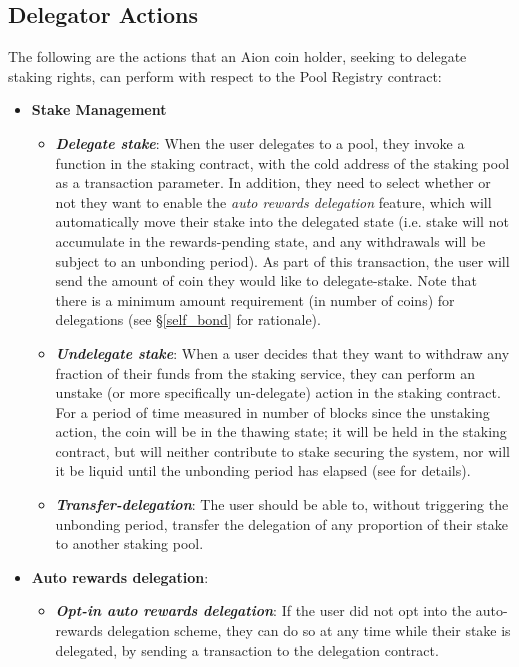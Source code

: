 \subsection{Delegator Actions}
The following are the actions that an Aion coin holder, seeking to delegate staking rights, can perform with respect to the Pool Registry contract: 
\begin{itemize}
    \item \textbf{Stake Management}
    \begin{itemize}
        \item \textit{\textbf{Delegate stake}}: When the user delegates to a pool, they invoke a function in the staking contract, with the cold address of the staking pool as a transaction parameter. In addition, they need to select whether or not they want to enable the \textit{auto rewards delegation} feature, which will automatically move their stake into the delegated state (i.e. stake will not accumulate in the rewards-pending state, and any withdrawals will be subject to an unbonding period). As part of this transaction, the user will send the amount of coin they would like to delegate-stake. Note that there is a minimum amount requirement (in number of coins) for delegations (see \S\ref{self_bond} for rationale). 
        \item \textit{\textbf{Undelegate stake}}: When a user decides that they want to withdraw any fraction of their funds from the staking service, they can perform an unstake (or more specifically un-delegate) action in the staking contract. For a period of time measured in number of blocks since the unstaking action, the coin will be in the thawing state; it will be held in the staking contract, but will neither contribute to stake securing the system, nor will it be liquid until the unbonding period has elapsed (see \cite{WZS19} for details).
        \item \textit{\textbf{Transfer-delegation}}: The user should be able to, without triggering the unbonding period, transfer the delegation of any proportion of their stake to another staking pool.
    \end{itemize}
    \clearpage
    \item \textbf{Auto rewards delegation}: 
    \begin{itemize}
        \item \textit{\textbf{Opt-in auto rewards delegation}}: If the user did not opt into the auto-rewards delegation scheme, they can do so at any time while their stake is delegated, by sending a transaction to the delegation contract. 

\end{itemize}
\end{itemize}
